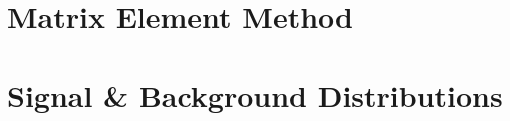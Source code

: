 \documentclass{cmspaper}
\begin{document}

  \section{Matrix Element Method}
     \label{app:matrixelement}
     
  \clearpage
  \section{Signal \& Background Distributions}
     \label{app:mvaplots}
     
  \clearpage
\end{document}
